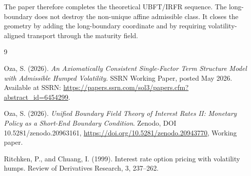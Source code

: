 \documentclass[11pt]{article}
\numberwithin{equation}{section}
\begin{document}
The paper therefore completes the theoretical UBFT/IRFR sequence. The long-boundary does not destroy the non-unique affine admissible class. It closes the geometry by adding the long-boundary coordinate and by requiring volatility-aligned transport through the maturity field.



\begin{thebibliography}{9}

Oza, S. (2026).
\emph{An Axiomatically Consistent Single-Factor Term Structure Model with Admissible Humped Volatility}.
SSRN Working Paper, posted May 2026.
Available at SSRN: \url{https://papers.ssrn.com/sol3/papers.cfm?abstract_id=6454299}.

Oza, S. (2026).
\emph{Unified Boundary Field Theory of Interest Rates II: Monetary Policy as a Short-End Boundary Condition}.
Zenodo, DOI {10.5281/zenodo.20963161},
\url {https://doi.org/10.5281/zenodo.20943770},
Working paper.

Ritchken, P., and Chuang, I. (1999).
Interest rate option pricing with volatility humps.
Review of Derivatives Research, 3, 237–262.

\end{thebibliography}
\end{document}
